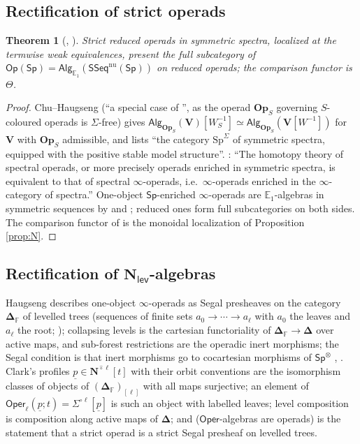 \documentclass[11pt]{amsart}
\newtheorem{theorem}[subsection]{Theorem}
\theoremstyle{definition}
\theoremstyle{remark}
\newcommand{\Sp}{\mathsf{Sp}}
\newcommand{\SSeq}{\mathsf{SSeq}}
\newcommand{\Oper}{\mathsf{Oper}}
\newcommand{\Op}{\mathsf{Op}}
\newcommand{\Alg}{\mathsf{Alg}}
\newcommand{\Nl}{\mathbf{N}_{\mathsf{lev}}}
\newcommand{\Fin}{\mathbb{F}}
\newcommand{\DFF}{\mathbf{\Delta}_{\Fin}}
\newcommand{\Th}{\Theta}
\begin{document}
\subsection{Rectification of strict operads}
\begin{theorem}[{\cite{CH20}, \cite{PS18}}]\label{thm:F3}
Strict reduced operads in symmetric spectra, localized at the termwise weak equivalences, present the full subcategory of $\Op(\Sp)=\Alg_{\mathbb{E}_1}(\SSeq^{\mathrm{nu}}(\Sp))$ on reduced operads; the comparison functor is $\Th$.
\end{theorem}
\begin{proof}
Chu--Haugseng \cite[Proposition 5.2.2]{CH20} (``a special case of \cite[Theorem 7.10]{PS18}'', as the operad $\mathbf{Op}_S$ governing $S$-coloured operads is $\Sigma$-free) gives $\Alg_{\mathbf{Op}_S}(\mathbf V)[W_S^{-1}]\simeq\Alg_{\mathbf{Op}_S}(\mathbf V[W^{-1}])$ for $\mathbf V$ with $\mathbf{Op}_S$ admissible, and \cite[Examples 5.2.3(iv)]{CH20} lists ``the category $\mathrm{Sp}^\Sigma$ of symmetric spectra, equipped with the positive stable model structure''. \cite[Theorem 5.2.10, Remark 5.2.11]{CH20}: ``The homotopy theory of spectral operads, or more precisely operads enriched in symmetric spectra, is equivalent to that of spectral $\infty$-operads, i.e.\ $\infty$-operads enriched in the $\infty$-category of spectra.'' One-object $\Sp$-enriched $\infty$-operads are $\mathbb{E}_1$-algebras in symmetric sequences by \cite[Corollary 4.2.9(iii)]{Hau} and \cite[\S 2.4]{CH20}; reduced ones form full subcategories on both sides. The comparison functor of \cite[Proposition 5.2.2]{CH20} is the monoidal localization of Proposition \ref{prop:N}.
\end{proof}

\subsection{Rectification of $\Nl$-algebras}\label{sec:F4S}
Haugseng describes one-object $\infty$-operads as Segal presheaves on the category $\DFF$ of levelled trees (sequences of finite sets $a_0\to\cdots\to a_\ell$ with $a_0$ the leaves and $a_\ell$ the root; \cite[\S 4.1--4.2]{Hau}); collapsing levels is the cartesian functoriality of $\DFF\to\mathbf\Delta$ over active maps, and sub-forest restrictions are the operadic inert morphisms; the Segal condition is that inert morphisms go to cocartesian morphisms of $\Sp^\otimes$ \cite[Notation 4.2.7]{Hau}, \cite[Definition 2.4.3]{CH20}. Clark's profiles $\underline p\in\mathbf N^{\hat\circ\ell}[t]$ with their orbit conventions \cite[Definition 6.5]{Cl1} are the isomorphism classes of objects of $(\DFF)_{[\ell]}$ with all maps surjective; an element of $\Oper_\ell(\underline p;t)=\Sigma^{\circ\ell}[\underline p]$ \cite[Definition 7.1]{Cl1} is such an object with labelled leaves; level composition \cite[Definitions 6.14--6.15]{Cl1} is composition along active maps of $\mathbf\Delta$; and \cite[Proposition 7.12]{Cl1} ($\Oper$-algebras are operads) is the statement that a strict operad is a strict Segal presheaf on levelled trees.
\end{document}
